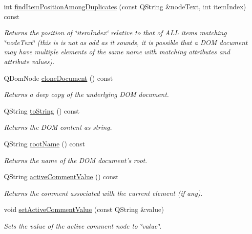 \begin{DoxyCompactItemize}
int \hyperlink{class_g_c_dom_tree_widget_a6da326993346229db9ba34fc13d7265e}{find\-Item\-Position\-Among\-Duplicates} (const \-Q\-String \&node\-Text, int item\-Index) const 
\begin{DoxyCompactList}\small\item\em \-Returns the position of \char`\"{}item\-Index\char`\"{} relative to that of \-A\-L\-L items matching \char`\"{}node\-Text\char`\"{} (this is is not as odd as it sounds, it is possible that a \-D\-O\-M document may have multiple elements of the same name with matching attributes and attribute values). \end{DoxyCompactList}\item 
\-Q\-Dom\-Node \hyperlink{class_g_c_dom_tree_widget_a25d3fcc908e06b83eba4f7d1c0e0df89}{clone\-Document} () const 
\begin{DoxyCompactList}\small\item\em \-Returns a deep copy of the underlying \-D\-O\-M document. \end{DoxyCompactList}\item 
\-Q\-String \hyperlink{class_g_c_dom_tree_widget_a6cd086334f363b2d0038c815e54c2b69}{to\-String} () const 
\begin{DoxyCompactList}\small\item\em \-Returns the \-D\-O\-M content as string. \end{DoxyCompactList}\item 
\-Q\-String \hyperlink{class_g_c_dom_tree_widget_af70ce22ef830a0a546262ff8566cd731}{root\-Name} () const 
\begin{DoxyCompactList}\small\item\em \-Returns the name of the \-D\-O\-M document's root. \end{DoxyCompactList}\item 
\-Q\-String \hyperlink{class_g_c_dom_tree_widget_aa633c35eca5e015becede2518e031042}{active\-Comment\-Value} () const 
\begin{DoxyCompactList}\small\item\em \-Returns the comment associated with the current element (if any). \end{DoxyCompactList}\item 
void \hyperlink{class_g_c_dom_tree_widget_a29bd5591054036ef5d6073a606716df3}{set\-Active\-Comment\-Value} (const \-Q\-String \&value)
\begin{DoxyCompactList}\small\item\em \-Sets the value of the active comment node to \char`\"{}value\char`\"{}. \end{DoxyCompactList}\item 

\end{DoxyCompactItemize}
